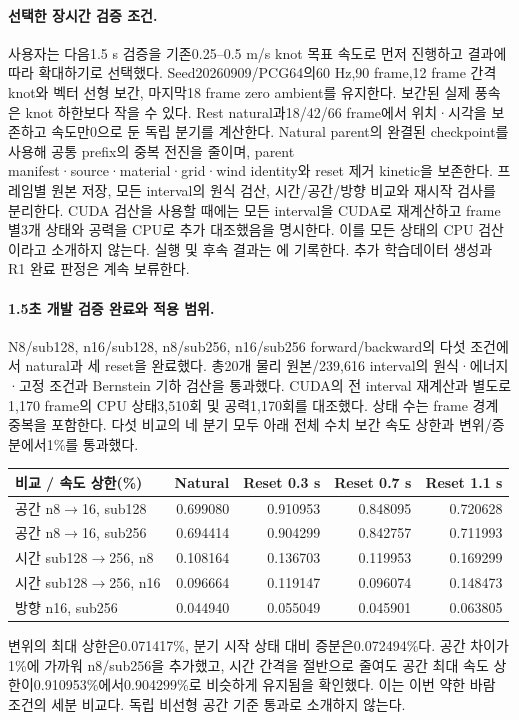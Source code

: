 \documentclass[10pt]{article}
\begin{document}
\paragraph{선택한 장시간 검증 조건.}
사용자는 다음1.5 s 검증을 기존0.25--0.5 m/s knot 목표 속도로 먼저 진행하고 결과에 따라
확대하기로 선택했다. Seed20260909/PCG64의60 Hz,90 frame,12 frame 간격 knot와 벡터 선형 보간,
마지막18 frame zero ambient를 유지한다. 보간된 실제 풍속은 knot 하한보다 작을 수 있다.
Rest natural과18/42/66 frame에서 위치·시각을 보존하고 속도만0으로 둔 독립 분기를 계산한다.
Natural parent의 완결된 checkpoint를 사용해 공통 prefix의 중복 전진을 줄이며,
parent manifest·source·material·grid·wind identity와 reset 제거 kinetic을 보존한다.
프레임별 원본 저장, 모든 interval의 원식 검산, 시간/공간/방향 비교와 재시작 검사를 분리한다.
CUDA 검산을 사용할 때에는 모든 interval을 CUDA로 재계산하고 frame별3개 상태와 공력을
CPU로 추가 대조했음을 명시한다. 이를 모든 상태의 CPU 검산이라고 소개하지 않는다.
실행 및 후속 결과는 에 기록한다.
추가 학습데이터 생성과 R1 완료 판정은 계속 보류한다.

\paragraph{1.5초 개발 검증 완료와 적용 범위.}
N8/sub128, n16/sub128, n8/sub256, n16/sub256 forward/backward의 다섯 조건에서
natural과 세 reset을 완료했다. 총20개 물리 원본/239,616 interval의 원식·에너지·고정 조건과
Bernstein 기하 검산을 통과했다. CUDA의 전 interval 재계산과 별도로1,170 frame의
CPU 상태3,510회 및 공력1,170회를 대조했다. 상태 수는 frame 경계 중복을 포함한다.
다섯 비교의 네 분기 모두 아래 전체 수치 보간 속도 상한과 변위/증분에서1\%를 통과했다.
\begin{center}
\begin{tabular}{lrrrr}
\toprule 비교 / 속도 상한(\%) & Natural & Reset 0.3 s & Reset 0.7 s & Reset 1.1 s\\\midrule
공간 n8$\to$16, sub128 & 0.699080 & 0.910953 & 0.848095 & 0.720628\\
공간 n8$\to$16, sub256 & 0.694414 & 0.904299 & 0.842757 & 0.711993\\
시간 sub128$\to$256, n8 & 0.108164 & 0.136703 & 0.119953 & 0.169299\\
시간 sub128$\to$256, n16 & 0.096664 & 0.119147 & 0.096074 & 0.148473\\
방향 n16, sub256 & 0.044940 & 0.055049 & 0.045901 & 0.063805\\
\bottomrule\end{tabular}\end{center}
변위의 최대 상한은0.071417\%, 분기 시작 상태 대비 증분은0.072494\%다.
공간 차이가1\%에 가까워 n8/sub256을 추가했고, 시간 간격을 절반으로 줄여도 공간 최대 속도
상한이0.910953\%에서0.904299\%로 비슷하게 유지됨을 확인했다.
이는 이번 약한 바람 조건의 세분 비교다. 독립 비선형 공간 기준 통과로 소개하지 않는다.
\end{document}
